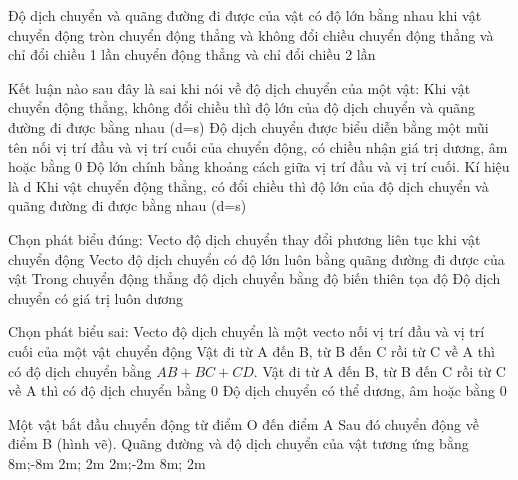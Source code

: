 \documentclass[Main.tex]{subfiles}
\begin{document}
	\begin{ex}
		[TH] Độ dịch chuyển và quãng đường đi được của vật có độ lớn bằng nhau khi vật
		\choice
		{chuyển động tròn}
		{chuyển động thẳng và không đổi chiều}
		{chuyển động thẳng và chỉ đổi chiều 1 lần}
		{chuyển động thẳng và chỉ đổi chiều 2 lần}
		\loigiai{}
	\end{ex}
	
	\begin{ex}
		[TH] Kết luận nào sau đây là sai khi nói về độ dịch chuyển của một vật:
		\choice
		{Khi vật chuyển động thẳng, không đổi chiều thì độ lớn của độ dịch chuyển và quãng đường đi được bằng nhau (d=s)}
		{Độ dịch chuyển được biểu diễn bằng một mũi tên nối vị trí đầu và vị trí cuối của chuyển động, có chiều nhận giá trị dương, âm hoặc bằng 0}
		{Độ lớn chính bằng khoảng cách giữa vị trí đầu và vị trí cuối. Kí hiệu là d}
		{Khi vật chuyển động thẳng, có đổi chiều thì độ lớn của độ dịch chuyển và quãng đường đi được bằng nhau (d=s)}
		\loigiai{}
	\end{ex}
	
	\begin{ex}
		[TH] Chọn phát biểu đúng:
		\choice
		{Vecto độ dịch chuyển thay đổi phương liên tục khi vật chuyển động}
		{Vecto độ dịch chuyển có độ lớn luôn bằng quãng đường đi được của vật}
		{Trong chuyển động thẳng độ dịch chuyển bằng độ biến thiên tọa độ}
		{Độ dịch chuyển có giá trị luôn dương}
		\loigiai{}
	\end{ex}
	
		\begin{ex}
			[TH] Chọn phát biểu sai:
			\choice
			{Vecto độ dịch chuyển là một vecto nối vị trí đầu và vị trí cuối của một vật chuyển động}
			{Vật đi từ A đến B, từ B đến C rồi từ C về A thì có độ dịch chuyển bằng $AB+BC+CD.$}
			{Vật đi từ A đến B, từ B đến C rồi từ C về A thì có độ dịch chuyển bằng 0}
			{Độ dịch chuyển có thể dương, âm hoặc bằng 0}
			\loigiai{}
		\end{ex}
		\begin{ex}
			[TH] Một vật bắt đầu chuyển động từ điểm O đến điểm A Sau đó chuyển động về điểm B (hình vẽ). Quãng đường và độ dịch chuyển của vật tương ứng bằng
			\choice
			{8m;-8m}
			{2m; 2m}
			{2m;-2m}
			{8m; 2m}
			\loigiai{}
		\end{ex}
			
\end{document}
